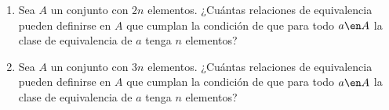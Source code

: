\begin{enunciado}{\ejercicio}
  \begin{enumerate}[label=\alph*)]
    \item Sea $A$ un conjunto con $2n$ elementos. ¿Cuántas relaciones de equivalencia pueden definirse en $A$ que cumplan la condición
          de que para todo $a \en A$ la clase de equivalencia de $a$ tenga $n$ elementos?

    \item Sea $A$ un conjunto con $3n$ elementos. ¿Cuántas relaciones de equivalencia pueden definirse en $A$ que cumplan la condición
          de que para todo $a \en A$ la clase de equivalencia de $a$ tenga $n$ elementos?

  \end{enumerate}
\end{enunciado}

\Hacer
